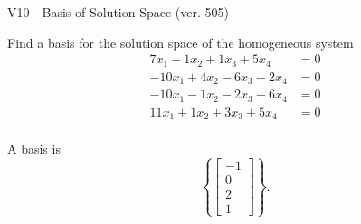 \begin{exercise}
  \begin{exerciseTitle}V10 - Basis of Solution Space (ver. 505)\end{exerciseTitle}
  \begin{exerciseStatement}
    Find a basis for the solution space of the homogeneous system 
\begin{align*}
 7 x_ 1 + 1 x_ 2 + 1 x_ 3 + 5 x_ 4 &= 0  \\ 
  -10 x_ 1 + 4 x_ 2 -6 x_ 3 + 2 x_ 4 &= 0  \\ 
  -10 x_ 1 -1 x_ 2 -2 x_ 3 -6 x_ 4 &= 0  \\ 
  11 x_ 1 + 1 x_ 2 + 3 x_ 3 + 5 x_ 4 &= 0  \\ 
 \end{align*}


 
  \end{exerciseStatement}

  \begin{exerciseAnswer}
   A basis is   
\[\left\{\left[\begin{array}{c}
-1 \\
0 \\
2 \\
1
\end{array}\right]\right\}.\]

  


  \end{exerciseAnswer}
\end{exercise}